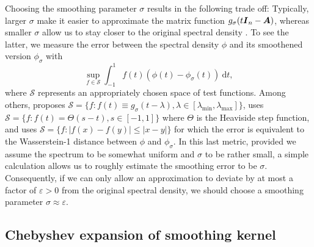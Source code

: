 \documentclass[12pt]{article}
\begin{document}
Choosing the smoothing parameter $\sigma$ results in the following trade off: Typically, larger $\sigma$ make it easier to approximate the matrix function $g_{\sigma}(t\boldsymbol{I}_n - \boldsymbol{A})$, whereas smaller $\sigma$ allow us to stay closer to the original spectral density . To see the latter, we measure the error between the spectral density $\phi$ and its smoothened version $\phi_{\sigma}$ with
\begin{equation}
    \sup_{f \in \mathcal{S}} \int_{-1}^{1} f(t) (\phi(t) - \phi_{\sigma}(t))~\mathrm{d}t,
    \label{equ:error-metric}
\end{equation}
where $\mathcal{S}$ represents an appropriately chosen space of test functions. Among others, \cite{lin-2016-approximating-spectral} proposes $\mathcal{S} = \{ f: f(t) \equiv g_{\sigma}(t - \lambda), \lambda \in [\lambda_{\text{min}}, \lambda_{\text{max}}]\}$, \cite{chen-2021-analysis-stochastic} uses $\mathcal{S} = \{f : f(t) = \Theta(s - t), s \in [-1, 1] \}$ where $\Theta$ is the Heaviside step function, and \cite{braverman-2022-sublinear-time} uses $\mathcal{S} = \{f : |f(x) - f(y)| \leq |x - y| \}$ for which the error  is equivalent to the Wasserstein-1 distance between $\phi$ and $\phi_{\sigma}$. In this last metric, provided we assume the spectrum to be somewhat uniform and $\sigma$ to be rather small, a simple calculation allows us to roughly estimate the smoothing error  to be $\sigma$. Consequently, if we can only allow an approximation to deviate by at most a factor of $\varepsilon > 0$ from the original spectral density, we should choose a smoothing parameter $\sigma \approx \varepsilon$.

\subsection{Chebyshev expansion of smoothing kernel}
\label{subsec:chebyshev-expansion}
\end{document}
